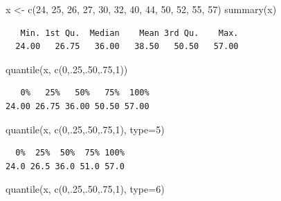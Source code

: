 \documentclass[
  letterpaper,
  DIV=11,
  numbers=noendperiod]{scrreprt}
\newenvironment{Shaded}{\begin{snugshade}}{\end{snugshade}}
\newcommand{\AttributeTok}[1]{\textcolor[rgb]{0.40,0.45,0.13}{#1}}
\newcommand{\DecValTok}[1]{\textcolor[rgb]{0.68,0.00,0.00}{#1}}
\newcommand{\FunctionTok}[1]{\textcolor[rgb]{0.28,0.35,0.67}{#1}}
\newcommand{\NormalTok}[1]{\textcolor[rgb]{0.00,0.23,0.31}{#1}}
\newcommand{\OtherTok}[1]{\textcolor[rgb]{0.00,0.23,0.31}{#1}}
\begin{document}
\begin{Shaded}
\begin{Highlighting}[]
\NormalTok{x }\OtherTok{\textless{}{-}} \FunctionTok{c}\NormalTok{(}\DecValTok{24}\NormalTok{, }\DecValTok{25}\NormalTok{, }\DecValTok{26}\NormalTok{, }\DecValTok{27}\NormalTok{, }\DecValTok{30}\NormalTok{, }\DecValTok{32}\NormalTok{, }\DecValTok{40}\NormalTok{, }\DecValTok{44}\NormalTok{, }\DecValTok{50}\NormalTok{, }\DecValTok{52}\NormalTok{, }\DecValTok{55}\NormalTok{, }\DecValTok{57}\NormalTok{)}
\FunctionTok{summary}\NormalTok{(x)}
\end{Highlighting}
\end{Shaded}

\begin{verbatim}
   Min. 1st Qu.  Median    Mean 3rd Qu.    Max. 
  24.00   26.75   36.00   38.50   50.50   57.00 
\end{verbatim}

\begin{Shaded}
\begin{Highlighting}[]
\FunctionTok{quantile}\NormalTok{(x, }\FunctionTok{c}\NormalTok{(}\DecValTok{0}\NormalTok{,.}\DecValTok{25}\NormalTok{,.}\DecValTok{50}\NormalTok{,.}\DecValTok{75}\NormalTok{,}\DecValTok{1}\NormalTok{))}
\end{Highlighting}
\end{Shaded}

\begin{verbatim}
   0%   25%   50%   75%  100% 
24.00 26.75 36.00 50.50 57.00 
\end{verbatim}

\begin{Shaded}
\begin{Highlighting}[]
\FunctionTok{quantile}\NormalTok{(x, }\FunctionTok{c}\NormalTok{(}\DecValTok{0}\NormalTok{,.}\DecValTok{25}\NormalTok{,.}\DecValTok{50}\NormalTok{,.}\DecValTok{75}\NormalTok{,}\DecValTok{1}\NormalTok{), }\AttributeTok{type=}\DecValTok{5}\NormalTok{)}
\end{Highlighting}
\end{Shaded}

\begin{verbatim}
  0%  25%  50%  75% 100% 
24.0 26.5 36.0 51.0 57.0 
\end{verbatim}

\begin{Shaded}
\begin{Highlighting}[]
\FunctionTok{quantile}\NormalTok{(x, }\FunctionTok{c}\NormalTok{(}\DecValTok{0}\NormalTok{,.}\DecValTok{25}\NormalTok{,.}\DecValTok{50}\NormalTok{,.}\DecValTok{75}\NormalTok{,}\DecValTok{1}\NormalTok{), }\AttributeTok{type=}\DecValTok{6}\NormalTok{)}
\end{Highlighting}
\end{Shaded}
\end{document}
